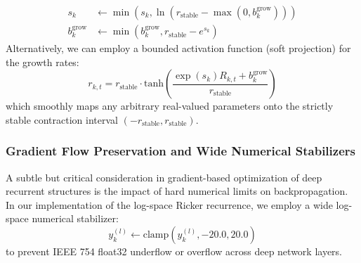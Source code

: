 \begin{enumerate}
    \begin{align}
        s_k &\leftarrow \min\left(s_k, \ln(r_{\text{stable}} - \max(0, b_k^{\text{grow}}))\right) \\
        b_k^{\text{grow}} &\leftarrow \min\left(b_k^{\text{grow}}, r_{\text{stable}} - e^{s_k}\right)
    \end{align}
    Alternatively, we can employ a bounded activation function (soft projection) for the growth rates:
    \begin{equation}
        r_{k, t} = r_{\text{stable}} \cdot \text{tanh}\left( \frac{\exp(s_k) R_{k, t} + b_k^{\text{grow}}}{r_{\text{stable}}} \right)
    \end{equation}
    which smoothly maps any arbitrary real-valued parameters onto the strictly stable contraction interval $(-r_{\text{stable}}, r_{\text{stable}})$.
\end{enumerate}

\subsubsection{Gradient Flow Preservation and Wide Numerical Stabilizers}
A subtle but critical consideration in gradient-based optimization of deep recurrent structures is the impact of hard numerical limits on backpropagation. In our implementation of the log-space Ricker recurrence, we employ a wide log-space numerical stabilizer:
\begin{equation}
    y_k^{(l)} \leftarrow \text{clamp}(y_k^{(l)}, -20.0, 20.0)
\end{equation}
to prevent IEEE 754 float32 underflow or overflow across deep network layers.

